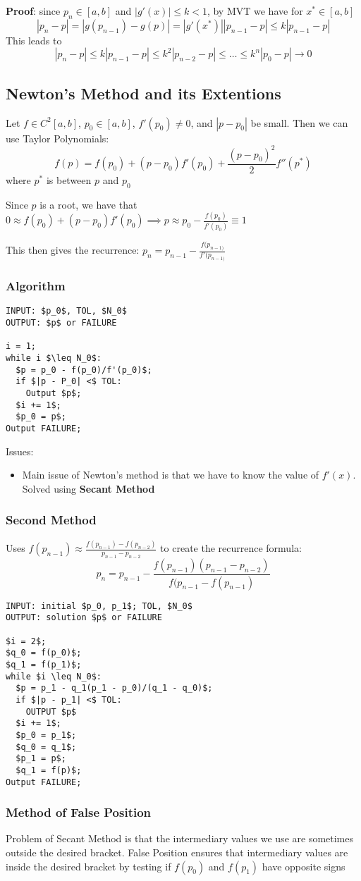 \documentclass{article}
\begin{document}
\textbf{Proof}: since $p_n \in [a,b]$ and $|g'(x)| \leq k < 1$, by MVT we have for $x^* \in [a,b]$
\[|p_n - p| = |g(p_{n-1}) - g(p)| = |g'(x^*)||p_{n-1} - p| \leq k|p_{n-1} - p|\]
This leads to
\[|p_n - p| \leq k|p_{n-1} - p| \leq k^2|p_{n-2} - p| \leq \ldots \leq k^n|p_0 - p| \rightarrow 0\]

\subsection{Newton's Method and its Extentions}
Let $f \in C^2[a,b]$, $p_0 \in [a,b]$, $f'(p_0) \neq 0$, and $|p- p_0|$ be small. Then we can use Taylor Polynomials:
\[f(p) = f(p_0) + (p-p_0)f'(p_0) + \frac{(p-p_0)^2}{2}f''(p^*)\]
where $p^*$ is between $p$ and $p_0$

Since $p$ is a root, we have that $0 \approx f(p_0) + (p-p_0)f'(p_0) \implies p \approx p_0 - \frac{f(p_0)}{f'(p_0)} \equiv 1$

This then gives the recurrence: $p_n = p_{n-1} - \frac{f(p_{n-1)}}{f'(p_{n - 1)}}$
\subsubsection{Algorithm}
\begin{lstlisting}
INPUT: $p_0$, TOL, $N_0$ 
OUTPUT: $p$ or FAILURE

i = 1;
while i $\leq N_0$:
  $p = p_0 - f(p_0)/f'(p_0)$;
  if $|p - P_0| <$ TOL:
    Output $p$;
  $i += 1$;
  $p_0 = p$;
Output FAILURE;
\end{lstlisting}
Issues:
\begin{itemize}
  \item Main issue of Newton's method is that we have to know the value of $f'(x)$. Solved using \textbf{Secant Method}
\end{itemize}
\subsubsection{Second Method}
Uses $f(p_{n-1}) \approx \frac{f(p_{n-1}) - f(p_{n - 2})}{p_{n-1} - p_{n-2}}$ to create the recurrence formula:
\[ p_n = p_{n - 1} - \frac{f(p_{n-1})(p_{n - 1} - p_{n-2})}{f(p_{n-1} - f(p_{n-1})}\]
\begin{lstlisting}
INPUT: initial $p_0, p_1$; TOL, $N_0$ 
OUTPUT: solution $p$ or FAILURE

$i = 2$;
$q_0 = f(p_0)$;
$q_1 = f(p_1)$;
while $i \leq N_0$:
  $p = p_1 - q_1(p_1 - p_0)/(q_1 - q_0)$;
  if $|p - p_1| <$ TOL:
    OUTPUT $p$
  $i += 1$;
  $p_0 = p_1$;
  $q_0 = q_1$;
  $p_1 = p$;
  $q_1 = f(p)$;
Output FAILURE;
\end{lstlisting}
\subsubsection{Method of False Position}
Problem of Secant Method is that the intermediary values we use are sometimes outside the desired bracket. False Position ensures that intermediary values are inside the desired bracket by testing if $f(p_0)$ and $f(p_1)$ have opposite signs
\end{document}
